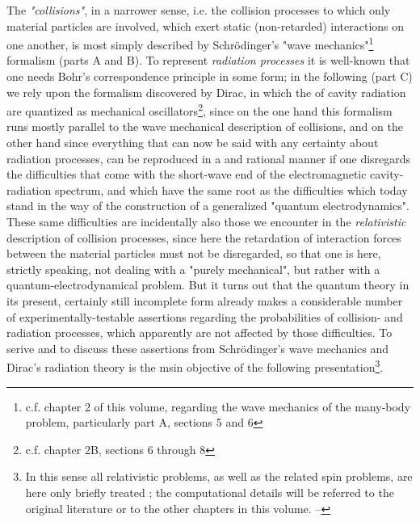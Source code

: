 \documentclass{report}
\begin{document}
The \textit{"collisions"}, in a narrower sense, i.e. the collision processes to which only material particles are involved, which exert static (non-retarded) interactions on one another, is most simply described by Schr\"odinger's "wave mechanics"\footnote{c.f. chapter 2 of this volume, regarding the wave mechanics of the many-body problem, particularly part A, sections 5 and 6} formalism  (parts A and B). To represent \textit{radiation processes} it is well-known that one needs Bohr's correspondence principle in some form; in the following (part C) we rely upon the formalism discovered by Dirac, in which the  of cavity radiation are quantized as mechanical oscillators\footnote{c.f. chapter 2B, sections 6 through 8}, since on the one hand this formalism runs mostly parallel to the wave mechanical description of collisions, and on the other hand since everything that can now be said with any certainty about radiation processes, can be reproduced in a  and rational manner if one disregards the difficulties that come with the short-wave end of the electromagnetic cavity-radiation spectrum, and which have the same root as the difficulties which today stand in the way of the construction of a generalized "quantum electrodynamics". These same difficulties are incidentally also those we encounter in the \textit{relativistic} description of collision processes, since here the retardation of interaction forces between the material particles must not be disregarded, so that one is here, strictly speaking, not dealing with a "purely mechanical", but rather with a quantum-electrodynamical problem. But it turns out that the quantum theory in its present, certainly still incomplete form already makes a considerable number of experimentally-testable assertions regarding the probabilities of collision- and radiation processes, which apparently are not affected by those difficulties. To serive and to discuss these assertions from Schr\"odinger's wave mechanics and Dirac's radiation theory is the msin objective of the following presentation\footnote{In this sense all  relativistic problems, as well as the related spin problems, are here only briefly treated ; the computational details will be referred to the original literature or to the other chapters in this volume. --}.
\end{document}

